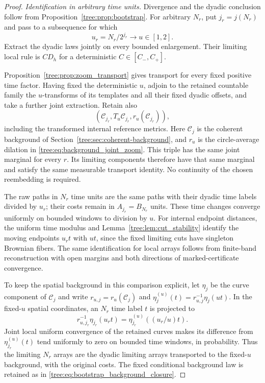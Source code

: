 \begin{proof}
\smallskip\noindent\emph{Identification in arbitrary time units.}
Divergence and the dyadic conclusion follow from
Proposition~\ref{tree:prop:bootstrap}. For arbitrary $N_r$, put
$j_r=j(N_r)$ and pass to a subsequence for which
\[
 u_r=N_r/2^{j_r}\longrightarrow u\in[1,2].
\]
Extract the dyadic laws jointly on every bounded enlargement.
Their limiting local rule is $C D_h$ for a deterministic
$C\in[C_-,C_+]$.

Proposition~\ref{tree:prop:zoom_transport} gives transport for
every fixed positive time factor. Having fixed the deterministic
$u$, adjoin to the retained countable family the $u$-transforms
of its templates and all their fixed dyadic offsets, and take a
further joint extraction. Retain also
\[
 (\mathcal C_{j_r},T_u\mathcal C_{j_r},r_u(\mathcal C_{j_r})),
\]
including the transformed internal reference metrics. Here
$\mathcal C_j$ is the coherent background of
Section~\ref{tree:sec:coherent-background}, and $r_u$ is the
circle-average dilation in
\eqref{tree:eq:background_joint_zoom}. This triple has the same
joint marginal for every $r$. Its limiting components therefore
have that same marginal and satisfy the same measurable transport
identity. No continuity of the chosen reembedding is required.

The raw paths in $N_r$ time units are the same paths with their
dyadic time labels divided by $u_r$; their costs remain in
$A_{j_r}=B_{N_r}$ units. These time changes converge uniformly on
bounded windows to division by $u$. For internal endpoint
distances, the uniform time modulus and
Lemma~\ref{tree:lem:cut_stability} identify the moving endpoints
$u_rt$ with $ut$, since the fixed limiting cuts have singleton
Brownian fibers. The same identification for local arrays follows
from finite-band reconstruction with open margins and both
directions of marked-certificate convergence.

To keep the spatial background in this comparison explicit,
let $\eta_j$ be the curve component of $\mathcal C_j$ and write
$r_{u,j}=r_u(\mathcal C_j)$ and
$\eta_j^{(u)}(t)=r_{u,j}^{-1}\eta_j(ut)$. In the fixed-$u$
spatial coordinates, an $N_r$ time label $t$ is projected to
\[
 r_{u,j_r}^{-1}\eta_{j_r}(u_rt)
       =\eta_{j_r}^{(u)}((u_r/u)t).
\]
Joint local uniform convergence of the retained curves makes
its difference from $\eta_{j_r}^{(u)}(t)$ tend uniformly to zero
on bounded time windows, in probability. Thus the limiting $N_r$ arrays are the
dyadic limiting arrays transported to the fixed-$u$ background,
with the original costs. The fixed conditional background law
is retained as in \eqref{tree:eq:bootstrap_background_closure}.


\end{proof}
